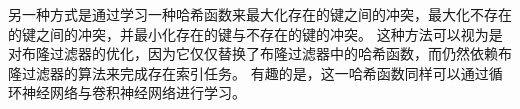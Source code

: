 另一种方式是通过学习一种哈希函数来最大化存在的键之间的冲突，最大化不存在的键之间的冲突，并最小化存在的键与不存在的键的冲突。
这种方法可以视为是对布隆过滤器的优化，因为它仅仅替换了布隆过滤器中的哈希函数，而仍然依赖布隆过滤器的算法来完成存在索引任务。
有趣的是，这一哈希函数同样可以通过循环神经网络与卷积神经网络进行学习。

